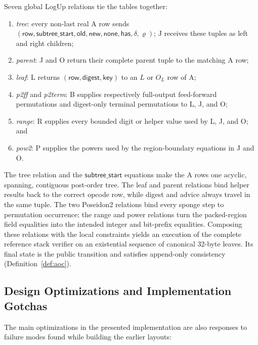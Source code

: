 \documentclass[11pt]{article}
\begin{document}
Seven global LogUp relations tie the tables together:
\begin{enumerate}[nosep]
    \item \emph{tree}: every non-last real A row sends $(\mathsf{row},\mathsf{subtree\_start},\mathsf{old},\mathsf{new},\mathsf{none},\mathsf{has},\delta,\varrho)$; J receives these tuples as left and right children;
    \item \emph{parent}: J and O return their complete parent tuple to the matching A row;
    \item \emph{leaf}: L returns $(\mathsf{row},\mathsf{digest},\mathsf{key})$ to an $L$ or $O_L$ row of A;
    \item \emph{p2ff} and \emph{p2term}: B supplies respectively full-output feed-forward permutations and digest-only terminal permutations to L, J, and O;
    \item \emph{range}: R supplies every bounded digit or helper value used by L, J, and O; and
    \item \emph{pow2}: P supplies the powers used by the region-boundary equations in J and O.
\end{enumerate}

The tree relation and the $\mathsf{subtree\_start}$ equations make the A rows one acyclic, spanning, contiguous post-order tree. The leaf and parent relations bind helper results back to the correct opcode row, while digest and advice always travel in the same tuple. The two Poseidon2 relations bind every sponge step to permutation occurrence; the range and power relations turn the packed-region field equalities into the intended integer and bit-prefix equalities. Composing these relations with the local constraints yields an execution of the complete reference stack verifier on an existential sequence of canonical 32-byte leaves. Its final state is the public transition and satisfies append-only consistency (Definition~\ref{def:aoc}).

\subsection{Design Optimizations and Implementation Gotchas}

The main optimizations in the presented implementation are also responses to failure modes found while building the earlier layouts:
\end{document}

